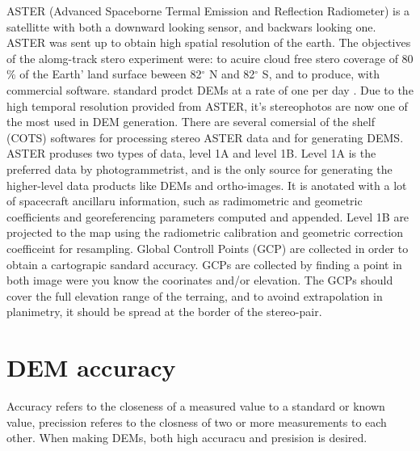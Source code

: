 \documentclass[a4paper,UKenglish]{article}
\begin{document}
ASTER (Advanced Spaceborne Termal Emission and Reflection Radiometer) is a satellitte with both a downward looking sensor, and  backwars looking one. ASTER was sent up to obtain high spatial resolution of the earth. The objectives of the alomg-track stero experiment were: to acuire cloud free stero coverage of 80$\%$ of the Earth' land surface beween 82$^{\circ}$ N and 82$^{\circ}$ S, and to produce, with commercial software. standard prodct DEMs at a rate of one per day \citep{toutin08}. Due to the high temporal resolution provided from ASTER, it's stereophotos are now one of the most used in DEM generation. There are several comersial of the shelf (COTS) softwares for processing stereo ASTER data and for generating DEMS. ASTER produses two types of data, level 1A and level 1B. Level 1A is the preferred data by photogrammetrist, and is the only source for generating the higher-level data products like DEMs and ortho-images. It is anotated with a lot of spacecraft ancillaru information, such as radimometric and geometric coefficients and georeferencing parameters computed and appended. Level 1B are projected to the map using the radiometric calibration and geometric correction coefficeint for resampling.
Global Controll Points (GCP) are collected in order to obtain a cartograpic sandard accuracy. GCPs are collected by finding a point in both image were you know the coorinates and/or elevation. The GCPs should cover the full elevation range of the terraing, and to avoind extrapolation in planimetry, it should be spread at the border of the stereo-pair.

\section{DEM accuracy}

Accuracy refers to the closeness of a measured value to a standard or known value, precission referes to the closness of two or more measurements to each other. When making DEMs, both high accuracu and presision is desired.



\end{document}
